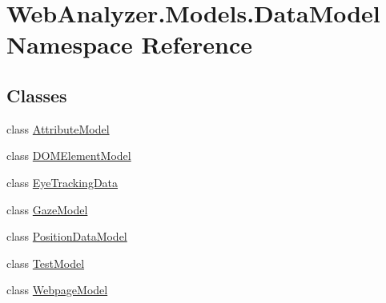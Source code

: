 \hypertarget{namespace_web_analyzer_1_1_models_1_1_data_model}{}\section{Web\+Analyzer.\+Models.\+Data\+Model Namespace Reference}
\label{namespace_web_analyzer_1_1_models_1_1_data_model}
\subsection*{Classes}
\begin{DoxyCompactItemize}
\item 
class \hyperlink{class_web_analyzer_1_1_models_1_1_data_model_1_1_attribute_model}{Attribute\+Model}
\item 
class \hyperlink{class_web_analyzer_1_1_models_1_1_data_model_1_1_d_o_m_element_model}{D\+O\+M\+Element\+Model}
\item 
class \hyperlink{class_web_analyzer_1_1_models_1_1_data_model_1_1_eye_tracking_data}{Eye\+Tracking\+Data}
\item 
class \hyperlink{class_web_analyzer_1_1_models_1_1_data_model_1_1_gaze_model}{Gaze\+Model}
\item 
class \hyperlink{class_web_analyzer_1_1_models_1_1_data_model_1_1_position_data_model}{Position\+Data\+Model}
\item 
class \hyperlink{class_web_analyzer_1_1_models_1_1_data_model_1_1_test_model}{Test\+Model}
\item 
class \hyperlink{class_web_analyzer_1_1_models_1_1_data_model_1_1_webpage_model}{Webpage\+Model}
\end{DoxyCompactItemize}
